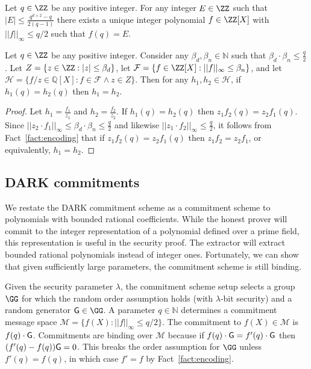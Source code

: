 \begin{fact}
\label{fact:encoding}
Let $q \in \ZZ$ be any positive integer. For any integer $E \in \ZZ$ such that $|E|\leq \frac{q^{d+2} - q}{2(q-1)}$ there exists a unique integer polynomial $f \in \ZZ[X]$ with $||f||_\infty \leq q/2$ such that $f(q) = E$. 
\end{fact} 

\begin{lemma}
\label{lem:encoding}
Let $q \in \ZZ$ be any positive integer. Consider any $\beta_d, \beta_n \in \mathbb{N}$ such that $\beta_d \cdot \beta_n\leq \frac{q}{2}$. Let $Z = \{z \in \ZZ: |z| \leq \beta_d \}$, let $\mathcal{F} = \{ f \in \ZZ[X]: ||f||_\infty \leq \beta_n\}$, and let $\mathcal{H} = \{f/z \in \mathbb{Q}[X]: f \in \mathcal{F} \wedge z \in Z \}$. Then for any $h_1, h_2 \in \mathcal{H}$,  if $h_1(q) = h_2(q)$ then $h_1 = h_2$. 
\end{lemma}
\begin{proof}
Let $h_1 = \frac{f_1}{z_1}$ and $h_2 = \frac{f_2}{z_2}$. If $h_1(q) = h_2(q)$ then $z_1 f_2(q) = z_2 f_1(q)$. Since $||z_2 \cdot f_1||_\infty \leq \beta_d \cdot \beta_n \leq \frac{q}{2}$ and  likewise $||z_1\cdot f_2||_\infty \leq \frac{q}{2}$, it follows from Fact~\ref{fact:encoding} that if $z_1 f_2(q) = z_2 f_1(q)$ then $z_1 f_2 = z_2 f_1$, or equivalently, $h_1 = h_2$.
\end{proof}


\subsection{DARK commitments} 
We restate the DARK commitment scheme as a commitment scheme to polynomials with bounded rational coefficients. While the honest prover will commit to the integer representation of a polynomial defined over a prime field, this representation is useful in the security proof. The extractor will extract bounded rational polynomials instead of integer ones. Fortunately, we can show that given sufficiently large parameters, the commitment scheme is still binding.

Given the security parameter $\lambda$, the commitment scheme setup selects a group $\GG$ for which the random order assumption holds (with  $\lambda$-bit security) and a random generator $\gr{G} \in \GG$. A parameter $q \in \mathbb{N}$ determines a commitment message space $\mathcal{M} = \{f(X): ||f||_\infty \leq q/2\}$. The commitment to $f(X) \in \mathcal{M}$ is $f(q) \cdot  \gr{G}$. Commitments are binding over $\mathcal{M}$ because if $f(q) \cdot \gr{G} = f'(q) \cdot \gr{G}$ then $(f'(q) - f(q)) \gr{G} = 0$. This breaks the order assumption for $\GG$ unless $ f'(q) =  f(q)$, in which case $f' = f$ by Fact~\ref{fact:encoding}. 

